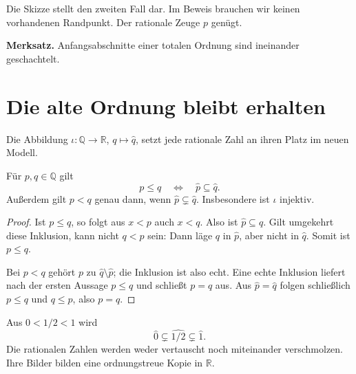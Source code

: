 \begin{center}
\end{center}
Die Skizze stellt den zweiten Fall dar. Im Beweis brauchen wir keinen
vorhandenen Randpunkt. Der rationale Zeuge $p$ genügt.

\textbf{Merksatz.}
Anfangsabschnitte einer totalen Ordnung sind ineinander geschachtelt.

\clearpage
\section{Die alte Ordnung bleibt erhalten}
\label{cuts:embedding}

Die Abbildung $\iota:\mathbb Q\to\mathbb R$, $q\mapsto\widehat q$,
setzt jede rationale Zahl an ihren Platz im neuen Modell.

\begin{satz}
Für $p,q\in\mathbb Q$ gilt
\[
 p\leq q\quad\Longleftrightarrow\quad\widehat p\subseteq\widehat q.
\]
Außerdem gilt $p<q$ genau dann, wenn
$\widehat p\subsetneq\widehat q$. Insbesondere ist $\iota$ injektiv.
\end{satz}

\begin{proof}
Ist $p\leq q$, so folgt aus $x<p$ auch $x<q$.
Also ist $\widehat p\subseteq\widehat q$.
Gilt umgekehrt diese Inklusion, kann nicht $q<p$ sein:
Dann läge $q$ in $\widehat p$, aber nicht in $\widehat q$.
Somit ist $p\leq q$.

Bei $p<q$ gehört $p$ zu $\widehat q\setminus\widehat p$;
die Inklusion ist also echt. Eine echte Inklusion liefert nach der
ersten Aussage $p\leq q$ und schließt $p=q$ aus.
Aus $\widehat p=\widehat q$ folgen schließlich $p\leq q$ und $q\leq p$,
also $p=q$.
\end{proof}

\begin{beispiel}
Aus $0<1/2<1$ wird
\[
 \widehat0\subsetneq\widehat{1/2}\subsetneq\widehat1.
\]
Die rationalen Zahlen werden weder vertauscht noch miteinander verschmolzen.
Ihre Bilder bilden eine ordnungstreue Kopie in $\mathbb R$.
\end{beispiel}

